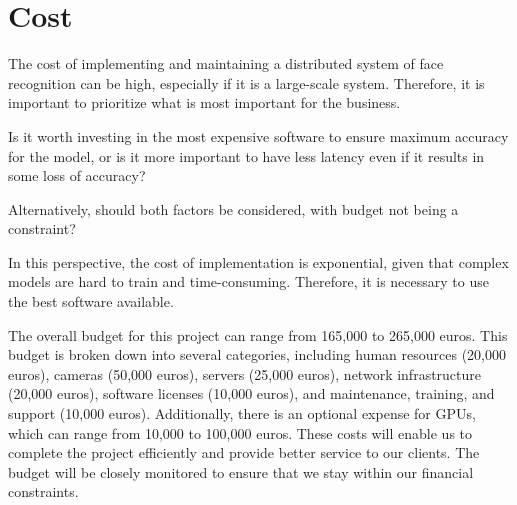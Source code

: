 \section{Cost}

\quad The cost of implementing and maintaining a distributed system of face recognition can be high, especially if it is a large-scale system. Therefore, it is important to prioritize what is most important for the business. 

Is it worth investing in the most expensive software to ensure maximum accuracy for the model, or is it more important to have less latency even if it results in some loss of accuracy? 

Alternatively, should both factors be considered, with budget not being a constraint? 

In this perspective, the cost of implementation is exponential, given that complex models are hard to train and time-consuming. Therefore, it is necessary to use the best software available.

The overall budget for this project can range from 165,000 to 265,000 euros. This budget is broken down into several categories, including human resources (20,000 euros), cameras (50,000 euros), servers (25,000 euros), network infrastructure (20,000 euros), software licenses (10,000 euros), and maintenance, training, and support (10,000 euros). Additionally, there is an optional expense for GPUs, which can range from 10,000 to 100,000 euros. These costs will enable us to complete the project efficiently and provide better service to our clients. The budget will be closely monitored to ensure that we stay within our financial constraints.
